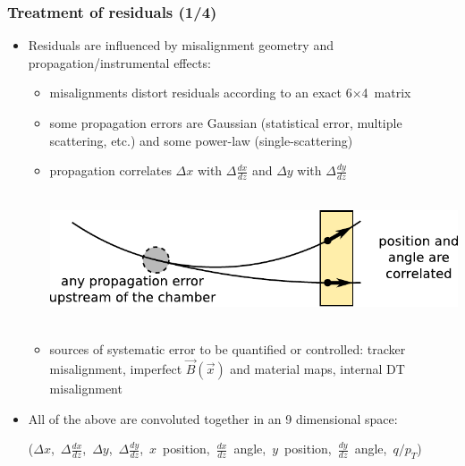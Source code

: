 \documentclass[compress]{beamer}
\begin{document}
\begin{frame}
\frametitle{Treatment of residuals (1/4)}

\begin{itemize}\setlength{\itemsep}{0.2 cm}
\item Residuals are influenced by misalignment geometry and propagation/instrumental effects:
\begin{itemize}\setlength{\itemsep}{0.2 cm}
\item misalignments distort residuals according to an exact \mbox{6$\times$4 matrix\hspace{-1 cm}}
\item some propagation errors are Gaussian (statistical error,
  multiple scattering, etc.) and some power-law (single-scattering)
\item propagation correlates $\Delta x$ with $\Delta \frac{dx}{dz}$ and $\Delta y$ with $\Delta \frac{dy}{dz}$

\mbox{ } \hfill \includegraphics[width=0.8\linewidth]{propagation_correlation.pdf} \hfill \hfill \mbox{ }

\item sources of systematic error to be quantified or controlled: tracker misalignment, imperfect $\vec{B}(\vec{x})$ and material maps, internal DT misalignment
\end{itemize}

\item All of the above are convoluted together in an 9 dimensional space:

\mbox{($\Delta x$, $\Delta \frac{dx}{dz}$, $\Delta y$, $\Delta \frac{dy}{dz}$, $x$ position, $\frac{dx}{dz}$ angle, $y$ position, $\frac{dy}{dz}$ angle, $q/p_T$)\hspace{-1 cm}}
\end{itemize}
\end{frame}
\end{document}
